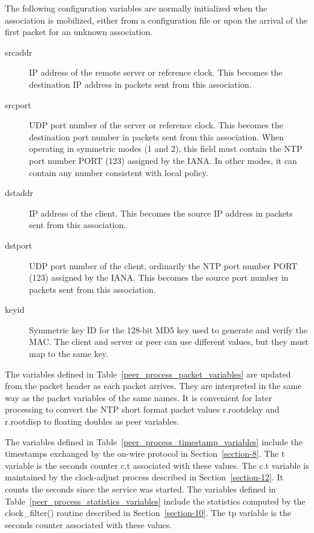The following configuration variables are normally initialized when
the association is mobilized, either from a configuration file or
upon the arrival of the first packet for an unknown association.

\begin{description}
  \item[srcaddr] IP address of the remote server or reference clock. This
    becomes the destination IP address in packets sent from this
    association.

  \item[srcport] UDP port number of the server or reference clock. This
    becomes the destination port number in packets sent from this
    association. When operating in symmetric modes (1 and 2), this field
    must contain the NTP port number PORT (123) assigned by the IANA. In
    other modes, it can contain any number consistent with local policy.

  \item[dstaddr] IP address of the client. This becomes the source IP
    address in packets sent from this association.

  \item[dstport] UDP port number of the client, ordinarily the NTP port
    number PORT (123) assigned by the IANA. This becomes the source port
    number in packets sent from this association.

  \item[keyid] Symmetric key ID for the 128-bit MD5 key used to generate and
    verify the MAC. The client and server or peer can use different
    values, but they must map to the same key.
\end{description}

The variables defined in Table~\ref{peer_process_packet_variables} are updated from the packet header
as each packet arrives. They are interpreted in the same way as the
packet variables of the same names. It is convenient for later
processing to convert the NTP short format packet values r.rootdelay
and r.rootdisp to floating doubles as peer variables.

The variables defined in Table~\ref{peer_process_timestamp_variables} include the timestamps exchanged
by the on-wire protocol in Section~\ref{section-8}. The t variable is the seconds
counter c.t associated with these values. The c.t variable is
maintained by the clock-adjust process described in Section~\ref{section-12}. It
counts the seconds since the service was started. The variables
defined in Table~\ref{peer_process_statistics_variables} include the statistics computed by the
clock\_filter() routine described in Section~\ref{section-10}. The tp variable is
the seconds counter associated with these values.

